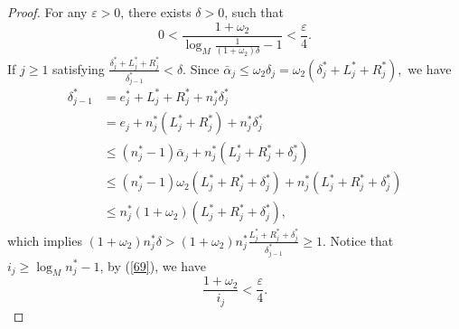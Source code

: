 \documentclass[10pt,a4paper]{amsart}
\begin{document}
\begin{proof}
For any $\varepsilon>0$, there exists $\delta>0$, such that
\begin{equation}\label{69}
0<\frac{1+\omega_2}{\log_M\frac{1}{(1+\omega_2)\delta}-1} <\frac{\varepsilon}{4}.
\end{equation}
If $j\ge1$ satisfying $\frac{\delta^*_j+L^*_j+R^*_j}{\delta^*_{j-1}} <\delta$.
Since $\bar{\alpha}_j\le \omega_2 \delta_j=\omega_2(\delta^*_j+L^*_j+R^*_j),$ we have
\begin{equation*}
\begin{aligned}
\delta^*_{j-1} & = e^*_{j}+L^*_j+R^*_j+n^*_j\delta^*_j\\
&=e_j+n^*_j(L^*_j+R^*_j)+n^*_j\delta^*_j\\
&\le (n^*_j-1)\bar{\alpha}_j+n^*_j(L^*_j+R^*_j+\delta^*_j)\\
&\le (n^*_j-1)\omega_2 (L^*_j+R^*_j+\delta^*_j)+n^*_j(L^*_j+R^*_j+\delta^*_j)\\
&\le n^*_j(1+\omega_2)(L^*_j+R^*_j+\delta^*_j),
\end{aligned}
\end{equation*}
which implies $(1+\omega_2)n^*_j\delta>(1+\omega_2)n^*_j\frac{L^*_j+R^*_j+\delta^*_j}{\delta^*_{j-1}} \ge 1.$
Notice that $i_j\ge \log_{M}n^*_j-1$, by (\ref{69}), we have
\begin{equation}\label{ss}
\frac{1+\omega_2}{i_j} <\frac{\varepsilon }{4}.
\end{equation}


\end{proof}
\end{document}
